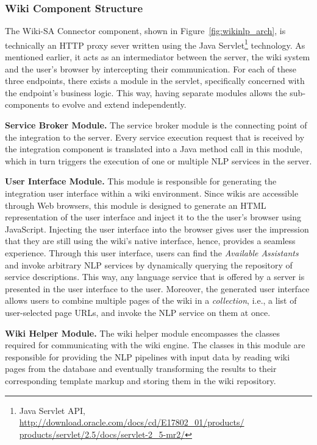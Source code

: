 \subsubsection{Wiki Component Structure}
The Wiki-SA Connector component, shown in Figure~\ref{fig:wikinlp_arch}, is technically an HTTP proxy sever written using the Java Servlet\footnote{Java Servlet API, \url{http://download.oracle.com/docs/cd/E17802_01/products/ products/servlet/2.5/docs/servlet-2_5-mr2/}} technology. As mentioned earlier, it acts as an intermediator between the \sa server, the wiki system and the user's browser by intercepting their communication. For each of these three endpoints, there exists a module in the servlet, specifically concerned with the endpoint's business logic. This way, having separate modules allows the sub-components to evolve and extend independently.

\blankline
\noindent
\textbf{Service Broker Module. }{The service broker module is the connecting point of the integration to the \sa server. Every service execution request that is received by the integration component is translated into a Java method call in this module, which in turn triggers the execution of one or multiple NLP services in the \sa server.}

\blankline
\noindent
\textbf{User Interface Module. }{This module is responsible for generating the integration user interface within a wiki environment. Since wikis are accessible through Web browsers, this module is designed to generate an HTML representation of the \sa user interface and inject it to the the user's browser using JavaScript. Injecting the user interface into the browser gives user the impression that they are still using the wiki's native interface, hence, provides a seamless experience. Through this user interface, users can find the \emph{Available Assistants} and invoke arbitrary NLP services by dynamically querying the \sa repository of service descriptions. This way, any language service that is offered by a \sa server is presented in the user interface to the user. Moreover, the generated user interface allows users to combine multiple pages of the wiki in a \emph{collection}, i.e., a list of user-selected page URLs, and invoke the NLP service on them at once.}

\blankline
\noindent
\textbf{Wiki Helper Module. }{The wiki helper module encompasses the classes required for communicating with the wiki engine. The classes in this module are responsible for providing the NLP pipelines with input data by reading wiki pages from the database and eventually transforming the results to their corresponding template markup and storing them in the wiki repository.}

